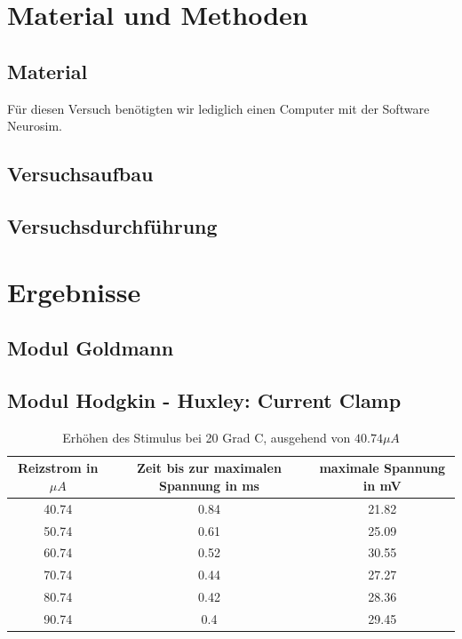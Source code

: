 \documentclass[11pt]{article}
\begin{document}
\section{Material und Methoden}
\subsection{Material}
Für diesen Versuch benötigten wir lediglich einen Computer mit der Software Neurosim. 

\subsection{Versuchsaufbau}

\subsection{Versuchsdurchführung}

\section{Ergebnisse}
\subsection{Modul Goldmann}

\subsection{Modul Hodgkin - Huxley: Current Clamp}

\begin{table}[H]
\caption{Erhöhen des Stimulus bei 20 Grad C, ausgehend von $40.74\mu A$}
\centering
\begin{adjustbox}{width=1.3\textwidth, center=\textwidth}
\begin{tabular}{c|c|c}
Reizstrom in $\mu A$ & Zeit bis zur maximalen Spannung in ms & maximale Spannung in mV \\
\hline\hline
40.74 & 0.84 & 21.82\\
50.74 & 0.61 & 25.09\\
60.74 & 0.52 & 30.55\\
70.74 & 0.44 & 27.27\\
80.74 & 0.42 & 28.36\\
90.74 & 0.4 & 29.45\\
\end{tabular}
\end{adjustbox}
\end{table} 
\end{document}
